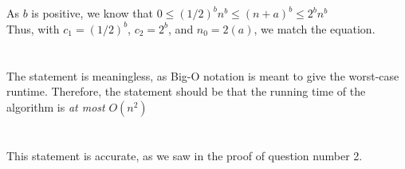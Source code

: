\documentclass{article}
\begin{document}
	\section{}
	
	As $b$ is positive, we know that $0\leq(1/2)^b n^b \leq (n+a)^b\leq 2^b n^b$\\
	Thus, with $c_1 = (1/2)^b$, $c_2=2^b$, and $n_0=2(a)$, we match the equation.
	
	\section{}
	The statement is meaningless, as Big-O notation is meant to give the worst-case runtime. Therefore, the statement should be that the running time of the algorithm is \textit{at most} $O(n^2)$
	
	\section{}
	This statement is accurate, as we saw in the proof of question number 2.
	
\end{document}
